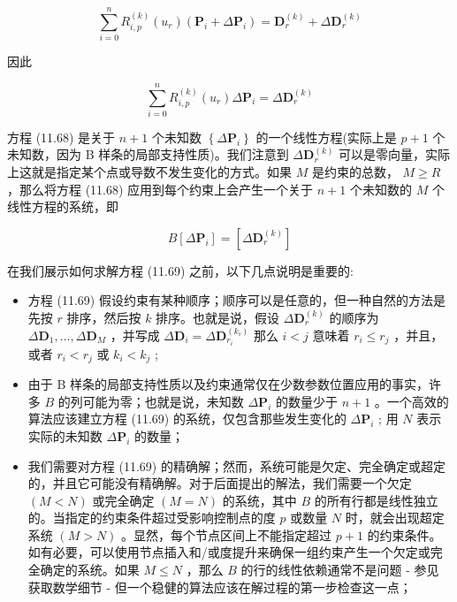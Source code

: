 \documentclass[../main.tex]{subfiles}
\begin{document}
\[
\mathop{\sum }\limits_{{i = 0}}^{n}{R}_{i,p}^{\left( k\right) }\left( {u}_{r}\right) \left( {{\mathbf{P}}_{i} + \Delta {\mathbf{P}}_{i}}\right)  = {\mathbf{D}}_{r}^{\left( k\right) } + \Delta {\mathbf{D}}_{r}^{\left( k\right) } \tag{11.67}
\]

因此

\[
\mathop{\sum }\limits_{{i = 0}}^{n}{R}_{i,p}^{\left( k\right) }\left( {u}_{r}\right) \Delta {\mathbf{P}}_{i} = \Delta {\mathbf{D}}_{r}^{\left( k\right) } \tag{11.68}
\]

方程 (11.68) 是关于 \(n + 1\) 个未知数 \(\left\{  {\Delta {\mathbf{P}}_{i}}\right\}\) 的一个线性方程(实际上是 \(p + 1\) 个未知数，因为 B 样条的局部支持性质)。我们注意到 \(\Delta {\mathbf{D}}_{r}^{\left( k\right) }\) 可以是零向量，实际上这就是指定某个点或导数不发生变化的方式。如果 \(M\) 是约束的总数， \(M \geq  R\) ，那么将方程 (11.68) 应用到每个约束上会产生一个关于 \(n + 1\) 个未知数的 \(M\) 个线性方程的系统，即

\[
B\left\lbrack  {\Delta {\mathbf{P}}_{i}}\right\rbrack   = \left\lbrack  {\Delta {\mathbf{D}}_{r}^{\left( k\right) }}\right\rbrack   \tag{11.69}
\]

在我们展示如何求解方程 (11.69) 之前，以下几点说明是重要的:

\begin{itemize}
\item 方程 (11.69) 假设约束有某种顺序；顺序可以是任意的，但一种自然的方法是先按 \(r\) 排序，然后按 \(k\) 排序。也就是说，假设 \(\Delta {\mathbf{D}}_{r}^{\left( k\right) }\) 的顺序为 \(\Delta {\mathbf{D}}_{1},\ldots ,\Delta {\mathbf{D}}_{M}\) ，并写成 \(\Delta {\mathbf{D}}_{i} = \Delta {\mathbf{D}}_{{r}_{i}}^{\left( {k}_{i}\right) }\) 那么 \(i < j\) 意味着 \({r}_{i} \leq  {r}_{j}\) ，并且，或者 \({r}_{i} < {r}_{j}\) 或 \({k}_{i} < {k}_{j}\) ;
\end{itemize}

\begin{itemize}
\item 由于 B 样条的局部支持性质以及约束通常仅在少数参数位置应用的事实，许多 \(B\) 的列可能为零；也就是说，未知数 \(\Delta {\mathbf{P}}_{i}\) 的数量少于 \(n + 1\) 。一个高效的算法应该建立方程 (11.69) 的系统，仅包含那些发生变化的 \(\Delta {\mathbf{P}}_{i}\) ; 用 \(N\) 表示实际的未知数 \(\Delta {\mathbf{P}}_{i}\) 的数量；
\end{itemize}

\begin{itemize}
\item 我们需要对方程 (11.69) 的精确解；然而，系统可能是欠定、完全确定或超定的，并且它可能没有精确解。对于后面提出的解法，我们需要一个欠定 \(\left( {M < N}\right)\) 或完全确定 \(\left( {M = N}\right)\) 的系统，其中 \(B\) 的所有行都是线性独立的。当指定的约束条件超过受影响控制点的度 \(p\) 或数量 \(N\) 时，就会出现超定系统 \(\left( {M > N}\right)\) 。显然，每个节点区间上不能指定超过 \(p + 1\) 的约束条件。如有必要，可以使用节点插入和/或度提升来确保一组约束产生一个欠定或完全确定的系统。如果 \(M \leq  N\) ，那么 \(B\) 的行的线性依赖通常不是问题 - 参见 \cite{Scho66,Good81,Fowl93} 获取数学细节 - 但一个稳健的算法应该在解过程的第一步检查这一点；
\end{itemize}
\end{document}
